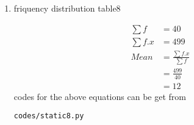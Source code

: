 \renewcommand{\theequation}{\theenumi}
\begin{enumerate}[label=\arabic*.,ref=\thesubsection.\theenumi]
\item \begin{table}[!ht]
	\centering
	
	\caption{friquency distribution table8 }
\end{table}
\begin{align}
\sum{f} &= 40
\\
\sum{f.x} &= 499
\\
Mean &= \frac{\sum{f.x}}{\sum{f}}
\\ &= \frac{499}{40}
\\&= 12
\end{align}
codes for the above equations can be get from
\begin{lstlisting}
codes/static8.py
\end{lstlisting}
\end{enumerate}